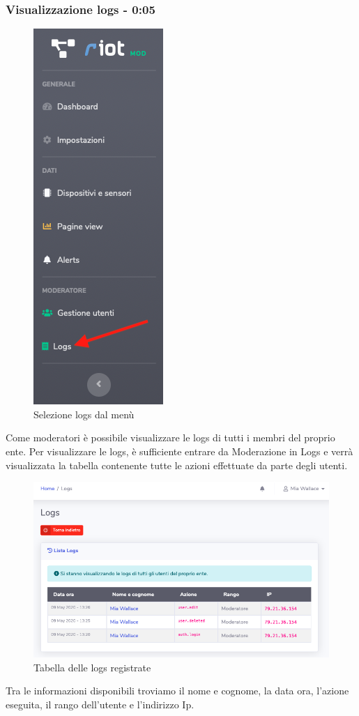 	\subsubsection{Visualizzazione logs - 0:05}
		\begin{figure}[H]
		\centering
		\includegraphics[scale=0.600]{res/images/mod/menuLogs.png}
		\caption{Selezione logs dal menù}
	\end{figure}
		Come moderatori è possibile visualizzare le logs di tutti i membri del proprio ente.
		Per visualizzare le logs, è sufficiente entrare da Moderazione in Logs e verrà visualizzata la tabella contenente tutte le azioni effettuate da parte degli utenti.
		\begin{figure}[H]
		\centering
		\includegraphics[scale=0.600]{res/images/mod/visLogs.png}
		\caption{Tabella delle logs registrate}
	\end{figure}
	Tra le informazioni disponibili troviamo il nome e cognome, la data ora, l’azione eseguita, il rango dell’utente e l’indirizzo Ip. 

